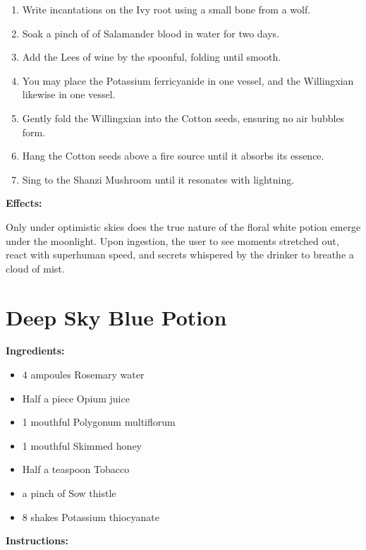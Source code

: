 \documentclass{article}
\begin{document}
\begin{enumerate}
  \item Write incantations on the Ivy root using a small bone from a wolf.
  \item Soak a pinch of of Salamander blood in water for two days.
  \item Add the Lees of wine by the spoonful, folding until smooth.
  \item You may place the Potassium ferricyanide in one vessel, and the Willingxian likewise in one vessel.
  \item Gently fold the Willingxian into the Cotton seeds, ensuring no air bubbles form.
  \item Hang the Cotton seeds above a fire source until it absorbs its essence.
  \item Sing to the Shanzi Mushroom until it resonates with lightning.
\end{enumerate}

\textbf{Effects:}

Only under optimistic skies does the true nature of the floral white potion emerge under the moonlight. Upon ingestion, the user to see moments stretched out, react with superhuman speed, and secrets whispered by the drinker to breathe a cloud of mist.

\newpage
\section*{Deep Sky Blue Potion}

\textbf{Ingredients:}

\begin{itemize}
  \item 4 ampoules Rosemary water
  \item Half a piece Opium juice
  \item 1 mouthful Polygonum multiflorum
  \item 1 mouthful Skimmed honey
  \item Half a teaspoon Tobacco
  \item a pinch of Sow thistle
  \item 8 shakes Potassium thiocyanate
\end{itemize}

\textbf{Instructions:}
\end{document}
